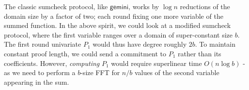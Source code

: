 \documentclass[11pt]{article} %
\newcommand{\gemini}{\ensuremath{\mathsf{gemini}}\xspace}
\newcommand{\eq}{\ensuremath{\mathsf{eq}}\xspace}
\renewcommand{\eq}{\ensuremath{\mathbf{eq}}\xspace}
\newcommand{\mle}[1]{\ensuremath{\mathsf{ml}(#1)}\xspace}
\begin{document}
The classic sumcheck protocol, like \gemini, works by $\log n$ reductions of the domain size by a factor of two; each round fixing one more variable of the summed function. In the above spirit, we could look at a modified sumcheck protocol, where the first variable ranges over a domain of super-constant size $b$. The first round univariate $P_1$ would thus have degree roughly $2b$. 
To maintain constant proof length, we could send a commitment to $P_1$ rather than its coefficients.
However, \emph{computing} $P_1$ would require superlinear time  $O(n \log b)$ - as we need to perform a $b$-size FFT for $n/b$ values of the second variable appearing in the sum. 


% 
% 
% 
% 
% 
% 
% 
% 
% 
% 
% 
% 
% 
\end{document}
